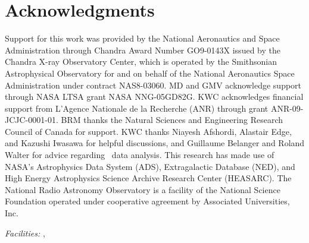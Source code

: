 \documentclass[useAMS,usenatbib]{mn2e}
\begin{document}
\section*{Acknowledgments}

Support for this work was provided by the National Aeronautics and
Space Administration through Chandra Award Number GO9-0143X issued by
the Chandra X-ray Observatory Center, which is operated by the
Smithsonian Astrophysical Observatory for and on behalf of the
National Aeronautics Space Administration under contract
NAS8-03060. MD and GMV acknowledge support through NASA LTSA grant
NASA NNG-05GD82G. KWC acknowledges financial support from L'Agence
Nationale de la Recherche (ANR) through grant ANR-09-JCJC-0001-01. BRM
thanks the Natural Sciences and Engineering Research Council of Canada
for support. KWC thanks Niayesh Afshordi, Alastair Edge, and Kazushi
Iwasawa for helpful discussions, and Guillaume Belanger and Roland
Walter for advice regarding \integral\ data analysis. This research
has made use of NASA's Astrophysics Data System (ADS), Extragalactic
Database (NED), and High Energy Astrophysics Science Archive Research
Center (HEASARC). The National Radio Astronomy Observatory is a
facility of the National Science Foundation operated under cooperative
agreement by Associated Universities, Inc.

{\it Facilities:} , 






\clearpage
\onecolumn







\label{lastpage}
\end{document}
